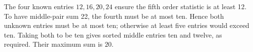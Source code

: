 The four known entries $12,16,20,24$ ensure the fifth order statistic is at least 12. To have middle-pair sum 22, the fourth must be at most ten. Hence both unknown entries must be at most ten; otherwise at least five entries would exceed ten. Taking both to be ten gives sorted middle entries ten and twelve, as required. Their maximum sum is $\boxed{20}$.
